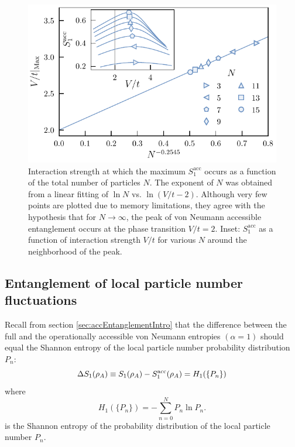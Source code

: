 \begin{figure}[h!]
\begin{center}
\includegraphics[scale=1.25]{peakScalingOddN.pdf}
\end{center}
\caption{Interaction strength at which the maximum $S_{1}^{\mathrm{acc}}$ occurs as a function of the total number of particles $N$. The exponent of $N$ was obtained from a linear fitting of $\ln N$ vs. $\ln{(V/t - 2)}$.  Although very few points are plotted due to memory limitations, they agree with the hypothesis that for $N \to \infty$, the peak of von Neumann accessible entanglement occurs at the phase transition $V/t = 2$. Inset: $S_{1}^{\mathrm{acc}}$ as a function of interaction strength $V/t$ for various $N$ around the neighborhood of the peak.}
\label{fig:peakScalingOddN}
\end{figure}

\subsection{Entanglement of local particle number fluctuations}

Recall from section \ref{sec:accEntanglementIntro} that the difference between the full and the operationally accessible von Neumann entropies $\left( \alpha = 1 \right)$ should equal the Shannon entropy of the local particle number probability distribution $P_n$:
%
\begin{equation}
    \Delta S_1 (\rho_A) \equiv S_1(\rho_A) - S_1^{\rm acc}(\rho_A) = H_1(\{P_n\})
    \label{eq:DeltaS1}
\end{equation}
%
where
%
\begin{equation}
    H_1(\{P_n\}) = -\sum_{n=0}^N P_n \ln P_n.
\label{eq:H1}
\end{equation}
%
is the Shannon entropy of the probability distribution of the local particle number $P_n$.

